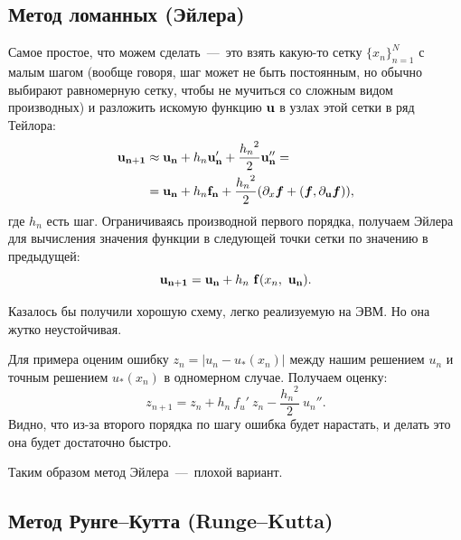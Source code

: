 \documentclass[a4paper,9pt,russian]{article}
\begin{document}
\subsection{Метод ломанных (Эйлера)}
    Самое простое, что можем сделать~---~это взять какую-то сетку $\bigl\{x_n\bigl\}_{n=1}^N$ с малым шагом (вообще говоря, шаг может не быть постоянным, но обычно выбирают равномерную сетку, чтобы не мучиться со сложным видом производных) и разложить искомую функцию ${\bf u}$ в узлах этой сетки в ряд Тейлора: 
\begin{equation}\label{Teylor}
\begin{split}
 {\bf u_{n+1}} & \approx {\bf u_{n}} + h_n{\bf u_{n}'}     +
    \frac{{h_n}^2}{2}{\bf u_{n}''} = \\
    & = {\bf u_{n}} + h_n{\bf f _{n}} + 
    \frac{{h_n}^2}{2}( \partial_x \boldsymbol{f} + (\boldsymbol{f}, \partial_{\bf u}\boldsymbol{f}) ),
\end{split}    
\end{equation}   
	где $h_n$ есть шаг. Ограничиваясь производной первого порядка, получаем { Эйлера} для вычисления значения функции в следующей точки сетки по значению в предыдущей:
    \begin{equation}\label{Eyler}
       {\bf u_{n+1}} = {\bf u_{n}} + h_n\ {\bf f}(x_n,\ {\bf u_{n}}).
    \end{equation}\par
    Казалось бы получили хорошую схему, легко реализуемую на ЭВМ. Но она жутко неустойчивая.\par
    Для примера оценим ошибку $z_n = |u_n - u_*(x_n)|$ между нашим решением $u_n$ и точным решением $u_*(x_n)$ в одномерном случае. Получаем оценку:
    \begin{equation}\label{6}
        z_{n+1} = z_n + h_n\ f_u'\ z_n - \frac{{h_n}^2}{2}\ u_n''.
    \end{equation}
    Видно, что из-за второго порядка по шагу ошибка будет нарастать, и делать это она будет достаточно быстро.\par Таким образом 
    {метод Эйлера~---~плохой вариант}.
\subsection{Метод Рунге--Кутта (Runge--Kutta)}
\end{document}
